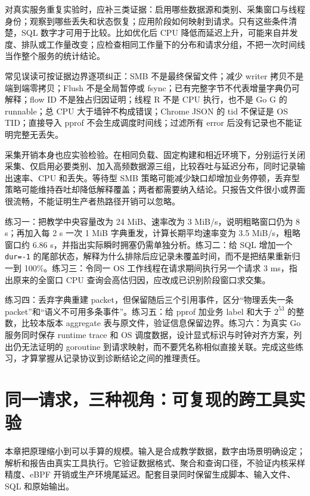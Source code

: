 \documentclass[UTF8,fontset=fandol,openany,11pt]{ctexbook}
\begin{document}
对真实服务重复实验时，应补三类证据：启用哪些数据源和类别、采集窗口与线程身份；观察到哪些丢失和状态恢复；应用阶段如何映射到请求。只有这些条件清楚，SQL 数字才可用于比较。比如优化后 CPU 降低而延迟上升，可能来自并发度、排队或工作量改变；应检查相同工作量下的分布和请求分组，不把一次时间线当作整个服务的统计结论。


常见误读可按证据边界逐项纠正：SMB 不是最终保留文件；减少 writer 拷贝不是端到端零拷贝；Flush 不是全局暂停或 fsync；已有完整字节不代表增量字典仍可解释；flow ID 不是独占归因证明；线程 R 不是 CPU 执行，也不是 Go G 的 runnable；总 CPU 大于墙钟不构成错误；Chrome JSON 的 tid 不保证是 OS TID；直接导入 pprof 不会生成调度时间线；过滤所有 error 后没有记录也不能证明完整无丢失。\cite{pf-service}\cite{pf-packet}\cite{pf-thread-state}\cite{pf-pprof}


采集开销本身也应实验检验。在相同负载、固定构建和相近环境下，分别运行关闭采集、仅启用必要类别、加入高频数据源三组，比较吞吐与延迟分布，同时记录输出速率、CPU 和丢失。等待型 SMB 策略可能减少缺口却增加业务停顿，丢弃型策略可能维持吞吐却降低解释覆盖；两者都需要纳入结论。只报告文件很小或界面很流畅，不能证明生产者热路径开销可以忽略。


练习一：把教学中央容量改为 24 MiB、速率改为 3 MiB/s，说明粗略窗口仍为 8 s；再加入每 2 s 一次 1 MiB 字典重发，计算长期平均速率变为 3.5 MiB/s，粗略窗口约 6.86 s，并指出实际瞬时拥塞仍需单独分析。练习二：给 SQL 增加一个 \texttt{dur=-\allowbreak{}1} 的尾部状态，解释为什么排除后应记录未覆盖时间，而不是把结果重新归一到 100\%。练习三：令同一 OS 工作线程在请求期间执行另一个请求 3 ms，指出原来的全窗口 CPU 查询会高估归因，应改成已识别阶段窗口求交集。


练习四：丢弃字典重建 packet，但保留随后三个引用事件，区分“物理丢失一条 packet”和“语义不可用多条事件”。练习五：给 pprof 加业务 label 和大于 \(2^{53}\) 的整数，比较本版本 aggregate 表与原文件，验证信息保留边界。练习六：为真实 Go 服务同时保存 runtime trace 和 OS 调度数据，设计显式标识与时钟对齐方案，列出仍无法证明的 goroutine 到请求映射，而不要凭名称相似直接关联。完成这些练习，才算掌握从记录协议到诊断结论之间的推理责任。


\chapter{同一请求，三种视角：可复现的跨工具实验}
\label{ch:21}

本章把原理缩小到可以手算的规模。输入是合成教学数据，数字由场景明确设定；解析和报告由真实工具执行。它验证数据格式、聚合和查询口径，不验证内核采样精度、eBPF 开销或生产环境尾延迟。配套目录同时保留生成脚本、输入文件、SQL 和原始输出。\cite{pp-teaching}\cite{pf-request}\cite{pf-validation}
\end{document}
